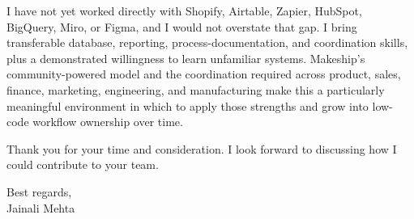 \documentclass[letterpaper,11pt]{article}
\begin{document}
\bigbreak
I have not yet worked directly with Shopify, Airtable, Zapier, HubSpot, BigQuery, Miro, or Figma, and I would not overstate that gap. I bring transferable database, reporting, process-documentation, and coordination skills, plus a demonstrated willingness to learn unfamiliar systems. Makeship's community-powered model and the coordination required across product, sales, finance, marketing, engineering, and manufacturing make this a particularly meaningful environment in which to apply those strengths and grow into low-code workflow ownership over time.

\bigbreak
Thank you for your time and consideration. I look forward to discussing how I could contribute to your team.

\bigbreak
Best regards,\\
Jainali Mehta
\end{document}
